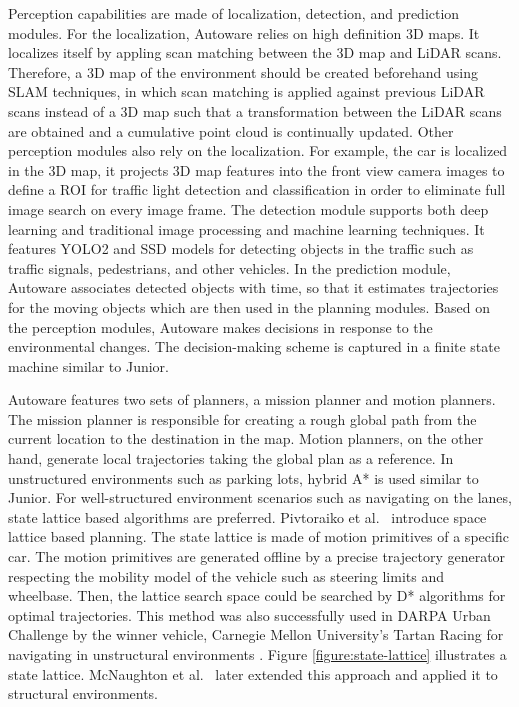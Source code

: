 Perception capabilities are made of localization, detection, and prediction
modules. For the localization, Autoware relies on high definition 3D maps. It
localizes itself by appling scan matching between the 3D map and LiDAR scans.
Therefore, a 3D map of the environment should be created beforehand using SLAM
techniques, in which scan matching is applied against previous LiDAR scans
instead of a 3D map such that a transformation between the LiDAR scans are
obtained and a cumulative point cloud is continually updated. Other perception
modules also rely on the localization. For example, the car is localized in
the 3D map, it projects 3D map features into the front view camera images to
define a ROI for traffic light detection and classification in order to
eliminate full image search on every image frame. The detection module supports
both deep learning and traditional image processing and machine learning
techniques. It features YOLO2 \cite{Redmon2016YOLO9000BF} and SSD
\cite{Liu2016SSDSS} models for detecting objects in the traffic such as traffic
signals, pedestrians, and other vehicles. In the prediction module, Autoware
associates detected objects with time, so that it estimates trajectories for
the moving objects which are then used in the planning modules. Based on the
perception modules, Autoware makes decisions in response to the environmental
changes. The decision-making scheme is captured in a finite state machine
similar to Junior.

Autoware features two sets of planners, a mission planner and motion planners.
The mission planner is responsible for creating a rough global path from the
current location to the destination in the map. Motion planners, on the other
hand, generate local trajectories taking the global plan as a reference. In
unstructured environments such as parking lots, hybrid A* is used similar to
Junior. For well-structured environment scenarios such as navigating on the
lanes, state lattice based algorithms are preferred. Pivtoraiko et al.\
\cite{Pivtoraiko2009DifferentiallyCM} introduce space lattice based planning.
The state lattice is made of motion primitives of a specific car. The motion
primitives are generated offline by a precise trajectory generator respecting
the mobility model of the vehicle such as steering limits and wheelbase. Then,
the lattice search space could be searched by D* algorithms for optimal
trajectories. This method was also successfully used in DARPA Urban Challenge
by the winner vehicle, Carnegie Mellon University's Tartan Racing for
navigating in unstructural environments \cite{Urmson2007TartanRA}. Figure
\ref{figure:state-lattice} illustrates a state lattice. McNaughton et al.\
\cite{McNaughton2011MotionPF} later extended this approach and applied it to
structural environments.

